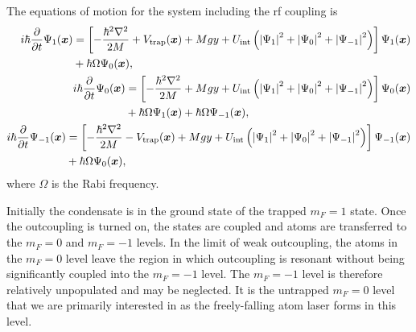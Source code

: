The equations of motion for the system including the rf coupling is
\begin{subequations}
    \label{BackgroundTheory:AtomLaserF1}
    \begin{align}
        \begin{split}
            i \hbar \frac{\partial}{\partial t} \Psi_1(\vect{x}) &= \left[ - \frac{\hbar^2 \nabla^2}{2 M} + V_\text{trap}(\vect{x}) + M g y + U_\text{int}\left(\abs{\Psi_1}^2 + \abs{\Psi_0}^2 + \abs{\Psi_{-1}}^2\right)\right] \Psi_1(\vect{x})\\
            & + \hbar \Omega \Psi_0(\vect{x}),
        \end{split}\\
        \begin{split}
            i \hbar \frac{\partial}{\partial t} \Psi_0(\vect{x}) &= \left[ - \frac{\hbar^2 \nabla^2}{2 M} + M g y + U_\text{int} \left(\abs{\Psi_1}^2 + \abs{\Psi_0}^2 + \abs{\Psi_{-1}}^2\right)\right] \Psi_0(\vect{x})\\
            & + \hbar \Omega \Psi_1(\vect{x}) + \hbar \Omega \Psi_{-1}(\vect{x}),
        \end{split}\\
        \begin{split}
            i \hbar \frac{\partial}{\partial t} \Psi_{-1}(\vect{x}) &= \left[ - \frac{\hbar^2 \nabla^2}{2 M} - V_\text{trap}(\vect{x}) + M g y + U_\text{int}\left(\abs{\Psi_1}^2 + \abs{\Psi_0}^2 + \abs{\Psi_{-1}}^2\right)\right] \Psi_{-1}(\vect{x})\\
            & + \hbar \Omega \Psi_0(\vect{x}),
        \end{split}
    \end{align}
\end{subequations}
where $\Omega$ is the Rabi frequency.

Initially the condensate is in the ground state of the trapped $m_F=1$ state.  Once the outcoupling is turned on, the states are coupled and atoms are transferred to the $m_F=0$ and $m_F=-1$ levels.  In the limit of weak outcoupling, the atoms in the $m_F=0$ level leave the region in which outcoupling is resonant without being significantly coupled into the $m_F=-1$ level.  The $m_F=-1$ level is therefore relatively unpopulated and may be neglected.  It is the untrapped $m_F=0$ level that we are primarily interested in as the freely-falling atom laser forms in this level.

